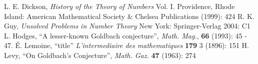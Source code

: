 \documentclass[12pt]{article}
\begin{document}
\begin{thebibliography}{3}
 L. E. Dickson, {\it History of the Theory of Numbers} Vol. I. Providence, Rhode Island: American Mathematical Society \& Chelsea Publications (1999): 424
 R. K. Guy, {\it Unsolved Problems in Number Theory} New York: Springer-Verlag 2004: C1
 L. Hodges, ``A lesser-known Goldbach conjecture'', {\it Math. Mag.}, {\bf 66} (1993): 45 - 47. 
 \'E. Lemoine, ``title'' {\it L'intermediaire des mathematiques} {\bf 179} 3 (1896): 151
 H. Levy, ``On Goldbach's Conjecture'', {\it Math. Gaz.} {\bf 47} (1963): 274
\end{thebibliography}
\end{document}
